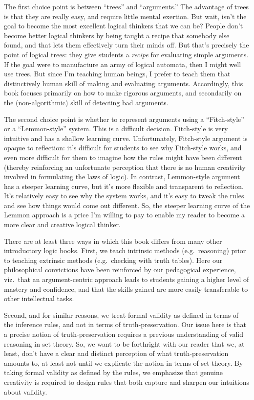 \documentclass[fleqn]{tufte-book}
\numberwithin{prop}{chapter}
\theoremstyle{definition}
\numberwithin{exercise}{chapter}
\begin{document}
The first choice point is between ``trees'' and ``arguments.''  The
advantage of trees is that they are really easy, and require little
mental exertion.  But wait, isn't the goal to become the most
excellent logical thinkers that we can be?  People don't become better
logical thinkers by being taught a recipe that somebody else found,
and that lets them effectively turn their minds off.  But that's
precisely the point of logical trees: they give students a {\it
  recipe} for evaluating simple arguments.  If the goal were to
manufacture an army of logical automata, then I might well use trees.
But since I'm teaching human beings, I prefer to teach them that
distinctively human skill of making and evaluating arguments.
Accordingly, this book focuses primarily on how to make rigorous
arguments, and secondarily on the (non-algorithmic) skill of detecting
bad arguments.

The second choice point is whether to represent arguments using a
``Fitch-style'' or a ``Lemmon-style'' system.  This is a difficult
decision.  Fitch-style is very intuitive and has a shallow learning
curve.  Unfortunately, Fitch-style argument is opaque to reflection:
it's difficult for students to see why Fitch-style works, and even
more difficult for them to imagine how the rules might have been
different (thereby reinforcing an unfortunate perception that there is
no human creativity involved in formulating the laws of logic).  In
contrast, Lemmon-style argument has a steeper learning curve, but it's
more flexible and transparent to reflection.  It's relatively easy to
see why the system works, and it's easy to tweak the rules and see how
things would come out different.  So, the steeper learning curve of
the Lemmon approach is a price I'm willing to pay to enable my reader
to become a more clear and creative logical thinker.

There are at least three ways in which this book differs from many
other introductory logic books.  First, we teach intrinsic methods
(e.g.\ reasoning) prior to teaching extrinsic methods (e.g.\ checking
with truth tables).  Here our philosophical convictions have been
reinforced by our pedagogical experience, viz.\ that an
argument-centric approach leads to students gaining a higher level of
mastery and confidence, and that the skills gained are more easily
transferable to other intellectual tasks.

Second, and for similar reasons, we treat formal validity as defined
in terms of the inference rules, and not in terms of
truth-preservation.  Our issue here is that a precise notion of
truth-preservation requires a previous understanding of valid
reasoning in set theory.  So, we want to be forthright with our reader
that we, at least, don't have a clear and distinct perception of what
truth-preservation amounts to, at least not until we explicate the
notion in terms of set theory.  By taking formal validity as defined
by the rules, we emphasize that genuine creativity is required to
design rules that both capture and sharpen our intuitions about
validity.
\end{document}
